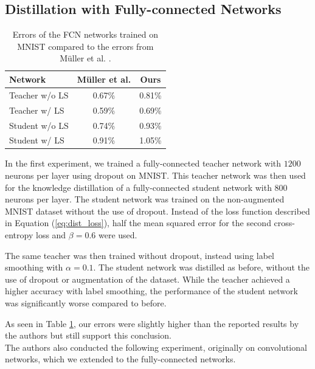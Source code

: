 \subsection{Distillation with Fully-connected Networks}

\begin{table}\vspace{-0.4cm}
\footnotesize
    \centering
    \caption{Errors of the FCN networks trained on MNIST compared to the errors from Müller et al. \cite{mueller2019}.}
    \begin{tabular}{|l|c|c|}
    \hline
        \sc Network & \sc Müller et al. & \sc Ours\\
        \hline
        \sc Teacher w/o LS & 0.67\% & 0.81\%\\
        \sc Teacher w/ LS & 0.59\% & 0.69\%\\
        \hline
        \sc Student w/o LS & 0.74\% & 0.93\%\\
        \sc Student w/ LS & 0.91\% & 1.05\%\\
        \hline
    \end{tabular}
    \label{tab:acc_toy_kd}
\end{table}

In the first experiment, we trained a fully-connected teacher network with $1200$ neurons per layer using dropout on MNIST. This teacher network was then used for the knowledge distillation of a fully-connected student network with $800$ neurons per layer. The student network was trained on the non-augmented MNIST dataset without the use of dropout. Instead of the loss function described in Equation (\ref{eq:dist_loss}), half the mean squared error for the second cross-entropy loss and $\beta = 0.6$ were used.

The same teacher was then trained without dropout, instead using label smoothing with $\alpha = 0.1$. The student network was distilled as before, without the use of dropout or augmentation of the dataset. While the teacher achieved a higher accuracy with label smoothing, the performance of the student network was significantly worse compared to before.

As seen in Table \ref{tab:acc_toy_kd}, our errors were slightly higher than the reported results by the authors but still support this conclusion.\\

The authors also conducted the following experiment, originally on convolutional networks, which we extended to the fully-connected networks.

